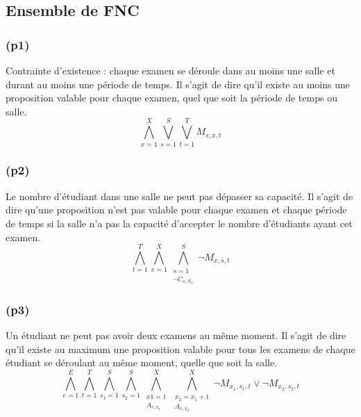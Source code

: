 \documentclass[a4paper,11pt]{article}
\begin{document}
\subsection{Ensemble de FNC}
\subsubsection{(p1)}
Contrainte d'existence : chaque examen se déroule dans au moins une salle et durant au moins une période de temps.
Il s'agit de dire qu'il existe au moins une proposition valable pour chaque examen, quel que soit la période de temps ou salle.
\begin{displaymath}
	\bigwedge\limits_{x=1}^{X}\bigvee\limits_{s=1}^{S}\bigvee\limits_{t=1}^{T} M_{s,x,t}
\end{displaymath}


\subsubsection{(p2)}
Le nombre d'étudiant dans une salle ne peut pas dépasser sa capacité.
Il s'agit de dire qu'une proposition n'est pas valable pour chaque examen et chaque période de temps si la salle n'a pas la capacité d'accepter le nombre d'étudiants ayant cet examen.
\begin{displaymath}
	\bigwedge\limits_{t=1}^{T}\bigwedge\limits_{x=1}^{X}\bigwedge\limits_{\substack{s=1 \\ \neg C_{s,N_{x}}}}^{S}  \neg M_{x,s,t}
\end{displaymath}

\subsubsection{(p3)}
Un étudiant ne peut pas avoir deux examens au même moment.
Il s'agit de dire qu'il existe au maximum une proposition valable pour tous les examens de chaque étudiant se déroulant au même moment, quelle que soit la salle.
\begin{displaymath}
\bigwedge\limits_{e=1}^{E}\bigwedge\limits_{t=1}^{T}\bigwedge\limits_{s_{1}=1}^{S}\bigwedge\limits_{s_{2}=1}^{S}\bigwedge\limits_{\substack{x1=1 \\ A_{e,x_{1}}}}^{X}\bigwedge\limits_{\substack{x_{2}=x_{1}+1 \\ A_{e,x_{2}}}}^{X} \neg M_{x_{1}, s_{1}, t} \vee \neg M_{x_{2}, s_{2}, t}
\end{displaymath}
\end{document}
